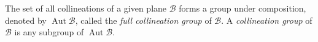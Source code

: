 The set of all collineations of a given plane $\mathcal{B}$ forms a group under composition, denoted by $\operatorname{Aut}\mathcal{B}$, called the \textit{full collineation group} of $\mathcal{B}$. A \textit{collineation group} of $\mathcal{B}$ is any subgroup of $\operatorname{Aut}\mathcal{B}$.
